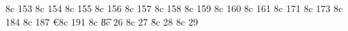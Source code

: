 {   \characterdel \pilcrow               8c  153
   \characterdel \baht                  8c  154
   \characterdel \numero                8c  155
   \characterdel \discount              8c  156
   \characterdel \estimated             8c  157
   \characterdel \openbullet            8c  158
   \characterdel \servicemark           8c  159
   \characterdel \lquill                8c  160
   \characterdel \rquill                8c  161
   \characterdel \copyleft              8c  171
   \characterdel \circledP              8c  173
   \characterdel {}         8c  184
   \characterdel \textsurd              8c  187
   \characterdel \euro                  8c  191
   \characterdel \circled               8c  {\aftergroup\circledcmd}
   \accentdel \t                    * 8c  26
   \accentdel \capitaltie           * 8c  27
   \accentdel \newtie               * 8c  28
   \accentdel \capitalnewtie        * 8c  29
}


